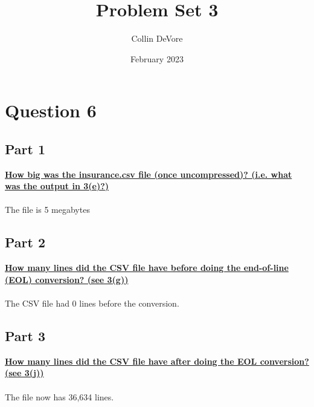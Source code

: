 \documentclass{article}
\title{Problem Set 3}
\author{Collin DeVore}
\date{February 2023}
\begin{document}
\maketitle

\section*{Question 6}
\subsection*{Part 1}
\underline{\textbf{How big was the insurance.csv file (once uncompressed)? (i.e. what}}\\ \underline{\textbf{was the output in 3(e)?)}}\\
    \\
The file is 5 megabytes\\

\subsection*{Part 2}
\underline{\textbf{How many lines did the CSV file have before doing the end-of-line}}\\ \underline{\textbf{(EOL) conversion? (see 3(g))}}\\
    \\
The CSV file had 0 lines before the conversion.\\

\subsection*{Part 3}
\underline{\textbf{How many lines did the CSV file have after doing the EOL conversion?}}\\ \underline{\textbf{(see 3(j))}}\\
    \\
The file now has 36,634 lines.\\
\end{document}
